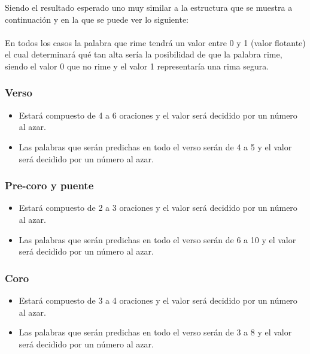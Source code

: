 \documentclass[12pt, a4paper, titlepage]{report}
\begin{document}
		Siendo el resultado esperado uno muy similar a la estructura que se muestra a continuación y en la que se puede ver lo siguiente:\\\\
		En todos los casos la palabra que rime tendrá un valor entre 0 y 1 (valor flotante) el cual determinará qué tan alta sería la posibilidad de que la palabra rime, siendo el valor 0 que no rime y el valor 1 representaría una rima segura. \\
		
		\subsubsection*{Verso}
		\begin{itemize}
			\item Estará compuesto de 4 a 6 oraciones y el valor será decidido por un número al azar.
			\item Las palabras que serán predichas en todo el verso serán de 4 a 5 y el valor será decidido por un número al azar.
		\end{itemize}
		
		\subsubsection*{Pre-coro y puente}
		\begin{itemize}
			\item Estará compuesto de 2 a 3 oraciones y el valor será decidido por un número al azar.
			\item Las palabras que serán predichas en todo el verso serán de 6 a 10 y el valor será decidido por un número al azar.
		\end{itemize}
	
		\subsubsection*{Coro}
		\begin{itemize}
			\item Estará compuesto de 3 a 4 oraciones y el valor será decidido por un número al azar.
			\item Las palabras que serán predichas en todo el verso serán de 3 a 8 y el valor será decidido por un número al azar.
		\end{itemize}
		
\end{document}
